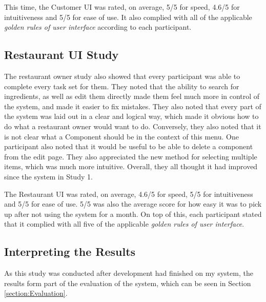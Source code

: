 This time, the Customer UI was rated, on average, 5/5 for speed, 4.6/5 for intuitiveness and 5/5 for ease of use. It also complied with all of the applicable \textit{golden rules of user interface} according to each participant. 

\subsection{Restaurant UI Study}

The restaurant owner study also showed that every participant was able to complete every task set for them. They noted that the ability to search for ingredients, as well as edit them directly made them feel much more in control of the system, and made it easier to fix mistakes. They also noted that every part of the system was laid out in a clear and logical way, which made it obvious how to do what a restaurant owner would want to do. Conversely, they also noted that it is not clear what a Component should be in the context of this menu. One participant also noted that it would be useful to be able to delete a component from the edit page. They also appreciated the new method for selecting multiple items, which was much more intuitive. Overall, they all thought it had improved since the system in Study 1.

The Restaurant UI was rated, on average, 4.6/5 for speed, 5/5 for intuitiveness and 5/5 for ease of use. 5/5 was also the average score for how easy it was to pick up after not using the system for a month. On top of this, each participant stated that it complied with all five of the applicable \textit{golden rules of user interface}.

\subsection{Interpreting the Results}

As this study was conducted after development had finished on my system, the results form part of the evaluation of the system, which can be seen in Section \ref{section:Evaluation}.

